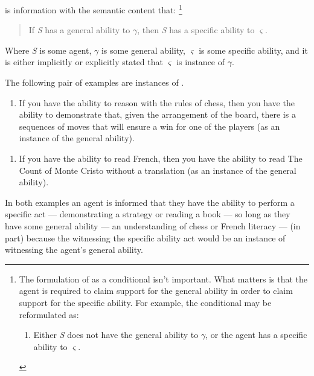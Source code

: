 \begin{note}
  \begin{definition}[\gsi{}]
    \Gsi{-} is information with the semantic content that:\nolinebreak
    \footnote{
      The formulation of \gsi{} as a conditional isn't important.
      What matters is that the agent is required to claim support for the general ability in order to claim support for the specific ability.
      For example, the conditional may be reformulated as:
      \begin{enumerate}[label=(\gsi{}\('\)), ref=(\gsi{}\('\))]
      \item Either \emph{S} does not have the general ability to \(\gamma\), or the agent has a specific ability to \(\varsigma\).
      \end{enumerate}
    }
    \begin{quote}
      If \emph{S} has a general ability to \(\gamma\), then \emph{S} has a specific ability to \(\varsigma\).
    \end{quote}
    Where \emph{S} is some agent, \(\gamma\) is some general ability, \(\varsigma\) is some specific ability, and it is either implicitly or explicitly stated that \(\varsigma\) is instance of \(\gamma\).
  \end{definition}

  The following pair of examples are instances of \gsi{}.
  \begin{enumerate}[label=(\gsi{}:\arabic*), ref=(\gsi{}:\arabic*)]
  \item\label{qe:cond} If you have the ability to reason with the rules of chess, then you have the ability to demonstrate that, given the arrangement of the board, there is a sequences of moves that will ensure a win for one of the players (as an instance of the general ability).
  \end{enumerate}

  \begin{enumerate}[label=(\gsi{}:\arabic*), ref=(\gsi{}:\arabic*), resume]
  \item\label{qe:cond:french} If you have the ability to read French, then you have the ability to read The Count of Monte Cristo without a translation (as an instance of the general ability).
  \end{enumerate}
  In both examples an agent is informed that they have the ability to perform a specific act --- demonstrating a strategy or reading a book --- so long as they have some general ability --- an understanding of chess or French literacy --- (in part) because the witnessing the specific ability act would be an instance of witnessing the agent's general ability.


\end{note}
